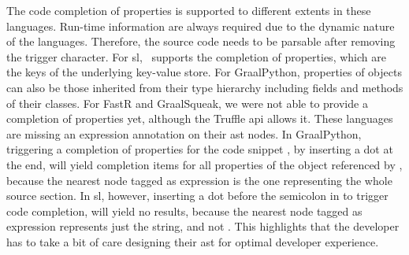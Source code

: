 \documentclass[sigplan,10pt,review,anonymous]{acmart}
\begin{document}



The code completion of properties is supported to different extents in these
languages. Run-time information are always required due to the dynamic nature of
the languages. Therefore, the source code needs to be parsable after removing
the trigger character. For \ac{sl}, \graallsp~supports the completion of
properties, which are the keys of the underlying key-value store. For
GraalPython, properties of objects can also be those inherited from their type
hierarchy including fields and methods of their classes. For FastR and
GraalSqueak, we were not able to provide a completion of properties yet,
although the Truffle \ac{api} allows it. These languages are missing an
expression annotation on their \ac{ast} nodes. In GraalPython, triggering a
completion of properties for the code snippet
, by inserting a dot at the end, will yield
completion items for all properties of the object referenced by
, because the nearest node tagged as
expression is the one representing the whole source section. In \ac{sl},
however, inserting a dot before the semicolon in
 to trigger code completion, will yield no
results, because the nearest node tagged as expression represents just the
 string, and not
. This highlights that the developer has to
take a bit of care designing their \ac{ast} for optimal developer experience.
\end{document}
